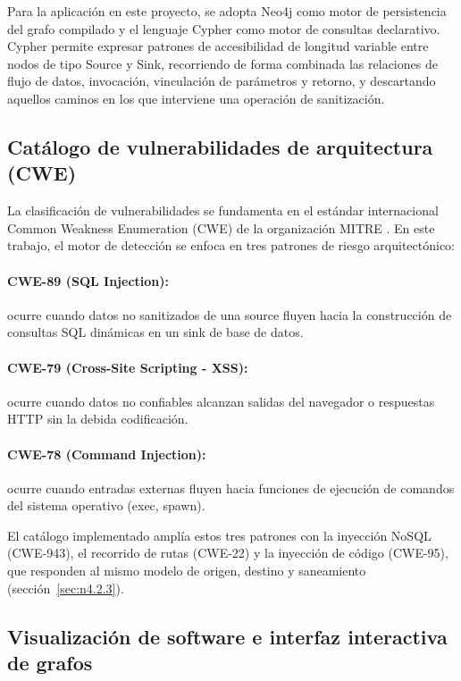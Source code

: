 Para la aplicación en este proyecto, se adopta Neo4j como motor de persistencia del grafo compilado y el lenguaje Cypher como motor de consultas declarativo. Cypher permite expresar patrones de accesibilidad de longitud variable entre nodos de tipo Source y Sink, recorriendo de forma combinada las relaciones de flujo de datos, invocación, vinculación de parámetros y retorno, y descartando aquellos caminos en los que interviene una operación de sanitización.

\subsection{Catálogo de vulnerabilidades de arquitectura (CWE)}\label{sec:n3.2.6}

La clasificación de vulnerabilidades se fundamenta en el estándar internacional Common Weakness Enumeration (CWE) de la organización MITRE \citep{mitrecwe}. En este trabajo, el motor de detección se enfoca en tres patrones de riesgo arquitectónico:

\paragraph{CWE-89 (SQL Injection):} ocurre cuando datos no sanitizados de una source fluyen hacia la construcción de consultas SQL dinámicas en un sink de base de datos.

\paragraph{CWE-79 (Cross-Site Scripting - XSS):} ocurre cuando datos no confiables alcanzan salidas del navegador o respuestas HTTP sin la debida codificación.

\paragraph{CWE-78 (Command Injection):} ocurre cuando entradas externas fluyen hacia funciones de ejecución de comandos del sistema operativo (exec, spawn).

El catálogo implementado amplía estos tres patrones con la inyección NoSQL (CWE-943), el recorrido de rutas (CWE-22) y la inyección de código (CWE-95), que responden al mismo modelo de origen, destino y saneamiento (sección~\ref{sec:n4.2.3}).

\subsection{Visualización de software e interfaz interactiva de grafos}\label{sec:n3.2.7}

